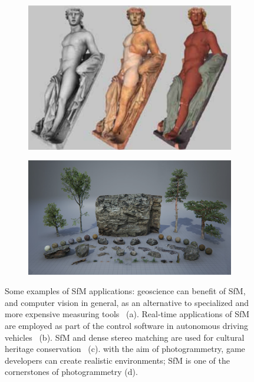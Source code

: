 \begin{figure}[h]
\begin{subfigure}{0.4\linewidth}
\includegraphics[width=\linewidth]{img/application_heritage.png}
\caption{}
\end{subfigure}
%
\begin{subfigure}{0.4\linewidth}
\centering
\includegraphics[width=\linewidth]{img/application_games.png}
\caption{}
\end{subfigure}
\caption{Some examples of SfM applications: geoscience can benefit of SfM, and computer vision in general, as
an alternative to specialized and more expensive measuring
tools~\cite{james2012straightforward} (a).
Real-time applications of SfM are employed as part of the control
software in autonomous driving vehicles~\cite{nister2004visual} (b).
SfM and dense stereo matching are used for cultural heritage
conservation~\cite{scopigno20113d} (c).
with the aim of photogrammetry, game developers can create realistic
environments; SfM is one of the cornerstones of photogrammetry (d)\protect\footnotemark.}
\end{figure}

